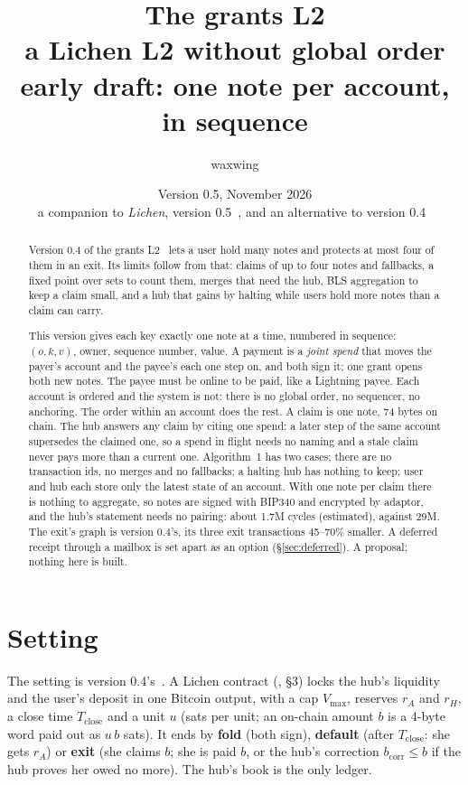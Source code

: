 \documentclass[11pt]{article}
\title{\textbf{The grants L2}\\a Lichen L2 without global order\\[2pt]\large early draft: one note per account, in sequence}
\author{waxwing}
\date{Version 0.5, November 2026\\[2pt]\small a companion to \emph{Lichen}, version 0.5~\cite{lichen}, and an alternative to version 0.4~\cite{grants04}}
\theoremstyle{plain}
\theoremstyle{definition}
\newcommand{\vmax}{V_{\max}}
\newcommand{\Tc}{T_{\mathrm{close}}}
\newcommand{\bcorr}{b_{\mathrm{corr}}}
\begin{document}
\maketitle

\begin{abstract}
Version 0.4 of the grants L2~\cite{grants04} lets a user hold many notes
and protects at most four of them in an exit. Its limits follow from
that: claims of up to four notes and fallbacks, a fixed point over sets
to count them, merges that need the hub, BLS aggregation to keep a claim
small, and a hub that gains by halting while users hold more notes than
a claim can carry.

This version gives each key exactly one note at a time, numbered in
sequence: $(o, k, v)$, owner, sequence number, value. A payment is a
\emph{joint spend} that moves the payer's account and the payee's each
one step on, and both sign it; one grant opens both new notes. The payee
must be online to be paid, like a Lightning payee. Each account is
ordered and the system is not: there is no global order, no sequencer,
no anchoring. The order within an account does the rest. A claim is one
note, 74 bytes on chain. The hub answers any claim by citing one spend:
a later step of the same account supersedes the claimed one, so a
spend in flight needs no naming and a stale claim never pays more than
a current one. Algorithm~1 has two cases; there are no transaction ids,
no merges and no fallbacks; a halting hub has nothing to keep; user and
hub each store only the latest state of an account. With one note per
claim there is nothing to aggregate, so notes are signed with BIP340 and
encrypted by adaptor, and the hub's statement needs no pairing: about
1.7M cycles (estimated), against 29M. The exit's graph is version
0.4's, its three exit transactions 45--70\% smaller. A deferred receipt
through a mailbox is set apart as an option (\S\ref{sec:deferred}). A
proposal; nothing here is built.
\end{abstract}

\tableofcontents

\section{Setting}

The setting is version 0.4's~\cite{grants04}. A Lichen contract
(\cite{lichen}, \S3) locks the hub's liquidity and the user's deposit in
one Bitcoin output, with a cap $\vmax$, reserves $r_A$ and $r_H$, a
close time $\Tc$ and a unit $u$ (sats per unit; an on-chain amount $b$
is a 4-byte word paid out as $u\,b$ sats). It ends by \textbf{fold}
(both sign), \textbf{default} (after $\Tc$: she gets $r_A$) or
\textbf{exit} (she claims $b$; she is paid $b$, or the hub's correction
$\bcorr \le b$ if the hub proves her owed no more). The hub's book is the
only ledger.
\end{document}
